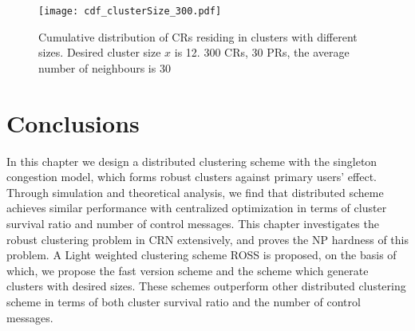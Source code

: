 
\begin{figure}[!h]
  \centering
   \texttt{[image: cdf\_clusterSize\_300.pdf]}
  \caption{Cumulative distribution of CRs residing in clusters with different sizes. Desired cluster size $x$ is 12. 300 CRs, 30 PRs, the average number of neighbours is 30}
  \label{cdf_clusterSize_300}
\end{figure}


\section{Conclusions}
\label{conclusion}
In this chapter we design a distributed clustering scheme with the singleton congestion model, which forms robust clusters against primary users' effect.
Through simulation and theoretical analysis, we find that distributed scheme achieves similar performance with centralized optimization in terms of cluster survival ratio and number of control messages.
This chapter investigates the robust clustering problem in CRN extensively, and proves the NP hardness of this problem.
A Light weighted clustering scheme ROSS is proposed, on the basis of which, we propose the fast version scheme and the scheme which generate clusters with desired sizes.
These schemes outperform other distributed clustering scheme in terms of both cluster survival ratio and the number of control messages.


